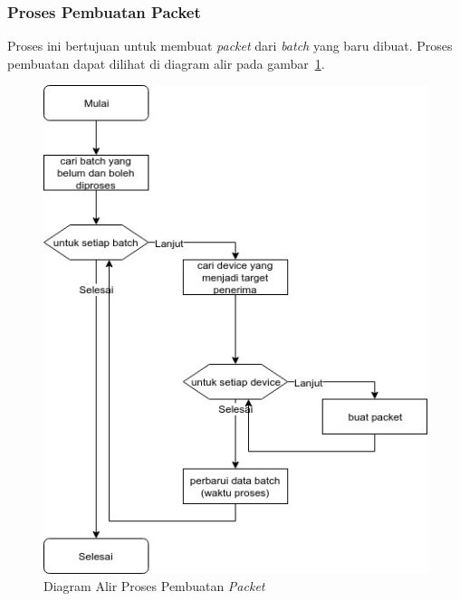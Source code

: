 \subsubsection{Proses Pembuatan Packet}
\par Proses ini bertujuan untuk membuat \textit{packet} dari \textit{batch} yang baru dibuat. Proses pembuatan dapat dilihat di diagram alir pada gambar~\ref{flowchart_pembuatan_packet}.
\begin{figure}[H]
    \centering\includegraphics[width=1\textwidth]{bab3/figures/flowchart_pembuatan_packet.jpg}
    \caption{Diagram Alir Proses Pembuatan \textit{Packet}}
    \label{flowchart_pembuatan_packet}
\end{figure}

